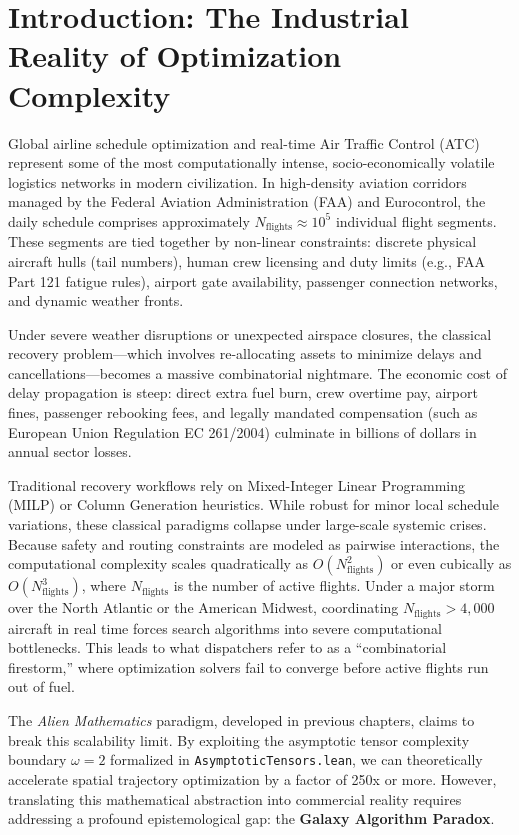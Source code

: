 \documentclass[11pt,a4paper]{book}
\begin{document}
\section{Introduction: The Industrial Reality of Optimization Complexity}\label{sec:introduction}

Global airline schedule optimization and real-time Air Traffic Control (ATC) represent some of the most computationally intense, socio-economically volatile logistics networks in modern civilization. In high-density aviation corridors managed by the Federal Aviation Administration (FAA) and Eurocontrol, the daily schedule comprises approximately $N_{\text{flights}} \approx 10^5$ individual flight segments. These segments are tied together by non-linear constraints: discrete physical aircraft hulls (tail numbers), human crew licensing and duty limits (e.g., FAA Part 121 fatigue rules), airport gate availability, passenger connection networks, and dynamic weather fronts.

Under severe weather disruptions or unexpected airspace closures, the classical recovery problem---which involves re-allocating assets to minimize delays and cancellations---becomes a massive combinatorial nightmare. The economic cost of delay propagation is steep: direct extra fuel burn, crew overtime pay, airport fines, passenger rebooking fees, and legally mandated compensation (such as European Union Regulation EC 261/2004) culminate in billions of dollars in annual sector losses. 

Traditional recovery workflows rely on Mixed-Integer Linear Programming (MILP) or Column Generation heuristics. While robust for minor local schedule variations, these classical paradigms collapse under large-scale systemic crises. Because safety and routing constraints are modeled as pairwise interactions, the computational complexity scales quadratically as $O(N_{\text{flights}}^2)$ or even cubically as $O(N_{\text{flights}}^3)$, where $N_{\text{flights}}$ is the number of active flights. Under a major storm over the North Atlantic or the American Midwest, coordinating $N_{\text{flights}} > 4,000$ aircraft in real time forces search algorithms into severe computational bottlenecks. This leads to what dispatchers refer to as a ``combinatorial firestorm,'' where optimization solvers fail to converge before active flights run out of fuel.

The \textit{Alien Mathematics} paradigm, developed in previous chapters, claims to break this scalability limit. By exploiting the asymptotic tensor complexity boundary $\omega = 2$ formalized in \texttt{AsymptoticTensors.lean}, we can theoretically accelerate spatial trajectory optimization by a factor of 250x or more. However, translating this mathematical abstraction into commercial reality requires addressing a profound epistemological gap: the \textbf{Galaxy Algorithm Paradox}. 
\end{document}
